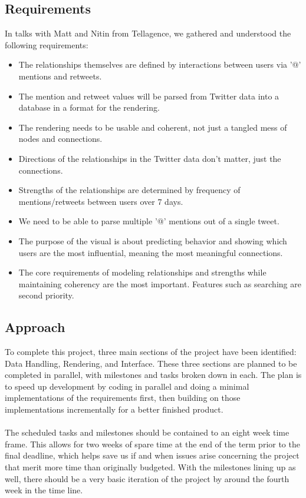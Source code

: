 \documentclass[12pt, letterpaper]{article}
\begin{document}
  \subsection{Requirements}
	In talks with Matt and Nitin from Tellagence, we gathered and understood the following requirements:
	\begin{itemize}
		\item The relationships themselves are defined by interactions between users via '@' mentions and retweets.
		\item The mention and retweet values will be parsed from Twitter data into a database in a format for the rendering.
		\item The rendering needs to be usable and coherent, not just a tangled mess of nodes and connections.
		\item Directions of the relationships in the Twitter data don't matter, just the connections.
		\item Strengths of the relationships are determined by frequency of mentions/retweets between users over 7 days.
		\item We need to be able to parse multiple '@' mentions out of a single tweet.
		\item The purpose of the visual is about predicting behavior and showing which users are the most influential, meaning the most meaningful connections.
		\item The core requirements of modeling relationships and strengths while maintaining coherency are the most important. Features such as searching are second priority.
	\end{itemize}

  \subsection{Approach}
	To complete this project, three main sections of the project have been identified: Data Handling, Rendering, and Interface. These three sections are planned to be completed in parallel, with milestones and tasks broken down in each. The plan is to speed up development by coding in parallel and doing a minimal implementations of the requirements first, then building on those implementations incrementally for a better finished product.
	\\\\
	The scheduled tasks and milestones should be contained to an eight week time frame. This allows for two weeks of spare time at the end of the term prior to the final deadline, which helps save us if and when issues arise concerning the project that merit more time than originally budgeted. With the milestones lining up as well, there should be a very basic iteration of the project by around the fourth week in the time line.
\end{document}

